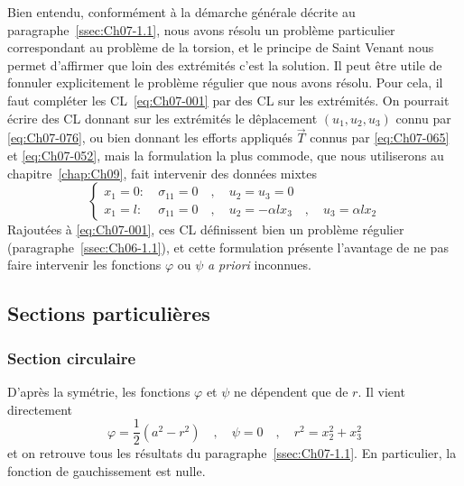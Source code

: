 Bien entendu, conformément à la démarche générale décrite au paragraphe~\ref{ssec:Ch07-1.1}, nous avons résolu un problème particulier correspondant au problème de la torsion, et le principe de Saint Venant nous permet d'affirmer que loin des extrémités c'est la solution.
Il peut être utile de fonnuler explicitement le problème régulier que nous avons résolu.
Pour cela, il faut compléter les CL~\eqref{eq:Ch07-001} par des CL sur les extrémités.
On pourrait écrire des CL donnant sur les extrémités le dêplacement $(u_1, u_2, u_3)$ connu par \eqref{eq:Ch07-076}, ou bien donnant les efforts appliqués $\vec{T}$ connus par \eqref{eq:Ch07-065} et \eqref{eq:Ch07-052}, mais la formulation la plus commode, que nous utiliserons au chapitre~\ref{chap:Ch09}, fait intervenir des données mixtes
\begin{equation}
    \left\{
    \begin{aligned}
        x_1 = 0 : &\ \sigma_{11} = 0 \quad , \quad u_2 = u_3 = 0 \\
        x_1 = l : &\ \sigma_{11} = 0 \quad , \quad u_2 = -\alpha l x_3 \quad,\quad u_3 = \alpha l x_2
    \end{aligned}
    \right.
    \label{eq:Ch07-079} 
\end{equation}
Rajoutées à \eqref{eq:Ch07-001}, ces CL définissent bien un problème régulier (paragraphe~\ref{ssec:Ch06-1.1}), et cette formulation présente l'avantage de ne pas faire intervenir les fonctions $\varphi$ ou $\psi$ \textit{a priori} inconnues. 

\subsection{Sections particulières} \label{ssec:Ch07-2.4}
\subsubsection{Section circulaire}
D'après la symétrie, les fonctions $\varphi$ et $\psi$ ne dépendent que de $r$.
Il vient directement 
\begin{equation}
    \varphi =\frac{1}{2}\left( a^2 - r^2 \right) \quad , \quad \psi = 0 \quad , \quad r^2 = x_2^2 + x_3^2 
    \label{eq:Ch07-080}
\end{equation}
et on retrouve tous les résultats du paragraphe~\ref{ssec:Ch07-1.1}.
En particulier, la fonction de gauchissement est nulle.
